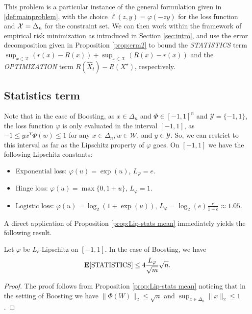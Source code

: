 This problem is a particular instance of the general formulation given in \eqref{def:mainproblem}, with the choice $\ell(z,y) = \varphi(-zy)$ for the loss function and $\mathcal{X}=\Delta_n$ for the constraint set. We can then work within the framework of empirical risk minimization as introduced in Section \ref{sec:intro}, and use the error decomposition given in Proposition \ref{prop:erm2} to bound the \emph{STATISTICS} term $\sup_{x\in\mathcal{X}} ( r(x) - R(x) ) + \sup_{x\in\mathcal{X}} ( R(x) - r(x) )$ and the \emph{OPTIMIZATION} term $R(\hat X_t) - R(X^\star)$, respectively.

\subsection{Statistics term}
Note that in the case of Boosting, as $x\in\Delta_n$ and $\Phi\in[-1,1]^n$ and $\mathcal{Y}=\{-1,1\}$, the loss function $\varphi$ is only evaluated in the interval $[-1,1]$, as $-1 \le yx^T\Phi(w) \le 1$ for any $x\in\Delta_n,w\in\mathcal{W}$, and $y\in\mathcal{Y}$. So, we can restrict to this interval as far as the Lipschitz property of $\varphi$ goes. On $[-1,1]$ we have the following Lipschitz constants:
\begin{itemize}
\item Exponential loss: $\varphi(u) = \exp(u)$, $L_\varphi = e$.
\item Hinge loss: $\varphi(u) = \max\{0,1+u\}$, $L_\varphi = 1$.
\item Logistic loss: $\varphi(u) = \log_2(1+\exp(u))$, $L_\varphi = \log_2(e)\frac{e}{1+e}\approx 1.05$.
\end{itemize}


A direct application of Proposition \ref{prop:Lip-stats mean} immediately yields the following result.
\begin{corollary}
\label{cor:Lip-stats Boosting}
Let $\varphi$ be $L_\ell$-Lipschitz on $[-1,1]$. In the case of Boosting, we have
$$
	\mathbf{E}[\textrm{STATISTICS}] 
	\le 4\frac{L_\varphi}{\sqrt{m}}\sqrt{n}.
$$
\end{corollary}

\begin{proof}
The proof follows from Proposition \ref{prop:Lip-stats mean} noticing that in the setting of Boosting we have $\|\Phi(W)\|_2\le \sqrt{n}$ and $\sup_{x\in\Delta_n}\|x\|_2 \le 1$.
\end{proof}

